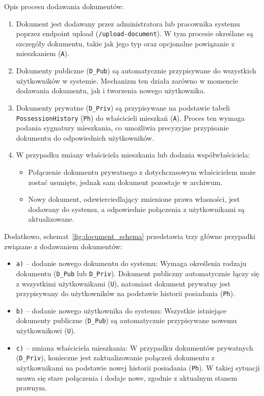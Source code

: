 Opis procesu dodawania dokumentów:
\begin{enumerate}
    \item Dokument jest dodawany przez administratora lub pracownika systemu poprzez endpoint upload (\texttt{/upload-document}). W tym procesie określane są szczegóły dokumentu, takie jak jego typ oraz opcjonalne powiązanie z mieszkaniem (\texttt{A}).
    \item Dokumenty publiczne (\texttt{D\_Pub}) są automatycznie przypisywane do wszystkich użytkowników w systemie. Mechanizm ten działa zarówno w momencie dodawania dokumentu, jak i tworzenia nowego użytkownika.
    \item Dokumenty prywatne (\texttt{D\_Priv}) są przypisywane na podstawie tabeli \texttt{PossessionHistory} (\texttt{Ph}) do właścicieli mieszkań (\texttt{A}). Proces ten wymaga podania sygnatury mieszkania, co umożliwia precyzyjne przypisanie dokumentu do odpowiednich użytkowników.
    \item W przypadku zmiany właściciela mieszkania lub dodania współwłaściciela:
    \begin{itemize}
        \item Połączenie dokumentu prywatnego z dotychczasowym właścicielem może zostać usunięte, jednak sam dokument pozostaje w archiwum.
        \item Nowy dokument, odzwierciedlający zmienione prawa własności, jest dodawany do systemu, a odpowiednie połączenia z użytkownikami są aktualizowane.
    \end{itemize}
\end{enumerate}

Dodatkowo, schemat~\ref{fig:document_schema} przedstawia trzy główne przypadki związane z dodawaniem dokumentów:
\begin{itemize}
    \item \texttt{a)} -- dodanie nowego dokumentu do systemu: Wymaga określenia rodzaju dokumentu (\texttt{D\_Pub} lub \texttt{D\_Priv}). Dokument publiczny automatycznie łączy się z wszystkimi użytkownikami (\texttt{U}), natomiast dokument prywatny jest przypisywany do użytkowników na podstawie historii posiadania (\texttt{Ph}).
    \item \texttt{b)} -- dodanie nowego użytkownika do systemu: Wszystkie istniejące dokumenty publiczne (\texttt{D\_Pub}) są automatycznie przypisywane nowemu użytkownikowi (\texttt{U}).
    \item \texttt{c)} -- zmiana właściciela mieszkania: W przypadku dokumentów prywatnych (\texttt{D\_Priv}), konieczne jest zaktualizowanie połączeń dokumentu z użytkownikami na podstawie nowej historii posiadania (\texttt{Ph}). W takiej sytuacji usuwa się stare połączenia i dodaje nowe, zgodnie z aktualnym stanem prawnym.
\end{itemize}

